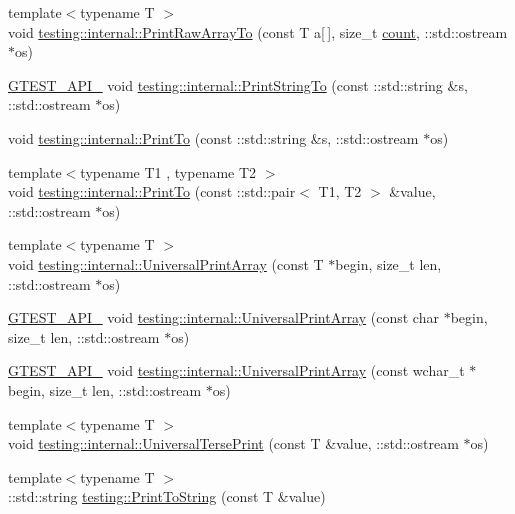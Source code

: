 \begin{DoxyCompactItemize}
\item 
{\footnotesize template$<$typename T $>$ }\\void \mbox{\hyperlink{namespacetesting_1_1internal_ad3013b6b4c825edee9fe18ff1d982faa}{testing\+::internal\+::\+Print\+Raw\+Array\+To}} (const T a\mbox{[}$\,$\mbox{]}, size\+\_\+t \mbox{\hyperlink{gmock__stress__test_8cc_afd9db40e3361ae09188795e8cbe19752}{count}}, \+::std\+::ostream $\ast$os)
\item 
\mbox{\hyperlink{gtest-port_8h_aa73be6f0ba4a7456180a94904ce17790}{G\+T\+E\+S\+T\+\_\+\+A\+P\+I\+\_\+}} void \mbox{\hyperlink{namespacetesting_1_1internal_a8b53e46cea3f8bdfc9342057c4f6ba62}{testing\+::internal\+::\+Print\+String\+To}} (const \+::std\+::string \&s, \+::std\+::ostream $\ast$os)
\item 
void \mbox{\hyperlink{namespacetesting_1_1internal_af59b4f5d83276cd807c45063b14bad44}{testing\+::internal\+::\+Print\+To}} (const \+::std\+::string \&s, \+::std\+::ostream $\ast$os)
\item 
{\footnotesize template$<$typename T1 , typename T2 $>$ }\\void \mbox{\hyperlink{namespacetesting_1_1internal_af2c33928facbf2edf7af564278724d98}{testing\+::internal\+::\+Print\+To}} (const \+::std\+::pair$<$ T1, T2 $>$ \&value, \+::std\+::ostream $\ast$os)
\item 
{\footnotesize template$<$typename T $>$ }\\void \mbox{\hyperlink{namespacetesting_1_1internal_ad79d71c3110f8eb24ab352d68f29436a}{testing\+::internal\+::\+Universal\+Print\+Array}} (const T $\ast$begin, size\+\_\+t len, \+::std\+::ostream $\ast$os)
\item 
\mbox{\hyperlink{gtest-port_8h_aa73be6f0ba4a7456180a94904ce17790}{G\+T\+E\+S\+T\+\_\+\+A\+P\+I\+\_\+}} void \mbox{\hyperlink{namespacetesting_1_1internal_a72c997dbd2c562110b2cb56c359decfa}{testing\+::internal\+::\+Universal\+Print\+Array}} (const char $\ast$begin, size\+\_\+t len, \+::std\+::ostream $\ast$os)
\item 
\mbox{\hyperlink{gtest-port_8h_aa73be6f0ba4a7456180a94904ce17790}{G\+T\+E\+S\+T\+\_\+\+A\+P\+I\+\_\+}} void \mbox{\hyperlink{namespacetesting_1_1internal_ae31e146c35fd75afc6a9cc73ae2692d1}{testing\+::internal\+::\+Universal\+Print\+Array}} (const wchar\+\_\+t $\ast$begin, size\+\_\+t len, \+::std\+::ostream $\ast$os)
\item 
{\footnotesize template$<$typename T $>$ }\\void \mbox{\hyperlink{namespacetesting_1_1internal_afa92f5a284929dc3723e654a25feb7b9}{testing\+::internal\+::\+Universal\+Terse\+Print}} (const T \&value, \+::std\+::ostream $\ast$os)
\item 
{\footnotesize template$<$typename T $>$ }\\\+::std\+::string \mbox{\hyperlink{namespacetesting_aa5717bb1144edd1d262d310ba70c82ed}{testing\+::\+Print\+To\+String}} (const T \&value)
\end{DoxyCompactItemize}
